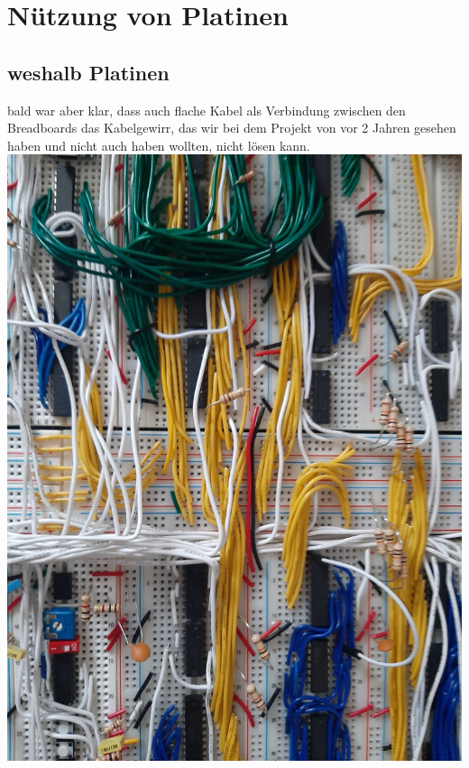 \documentclass{scrartcl}
\begin{document}
    \section{Nützung von Platinen}
    \subsection{weshalb Platinen}
    bald war aber klar, dass auch flache Kabel als Verbindung zwischen den Breadboards das Kabelgewirr, das wir bei dem Projekt von vor 2 Jahren gesehen haben
    und nicht auch haben wollten, nicht lösen kann.
    \includegraphics[width=\linewidth/2,angle=0]{Computer_V01_Chaos_07}
\end{document}
